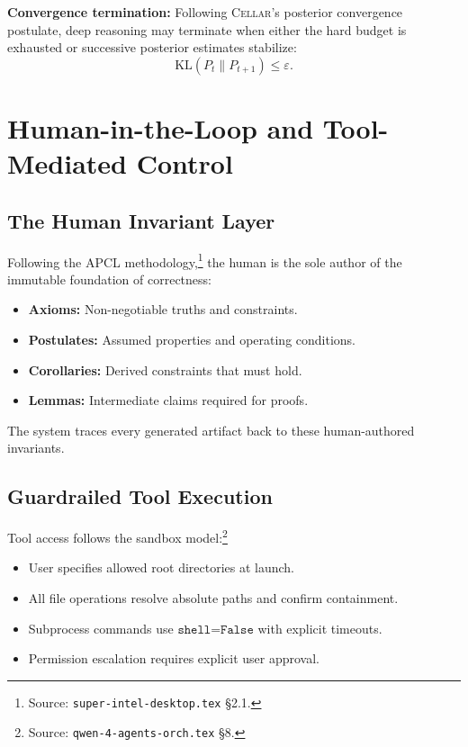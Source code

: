 \documentclass[11pt]{article}
\theoremstyle{remark}
\newcommand{\cellar}{\textsc{Cellar}}
\begin{document}
\textbf{Convergence termination:} Following \cellar{}'s posterior convergence postulate, deep reasoning may terminate when either the hard budget is exhausted or successive posterior estimates stabilize:
\[
\mathrm{KL}(P_t \| P_{t+1}) \le \varepsilon.
\]

\section{Human-in-the-Loop and Tool-Mediated Control}
\label{sec:hitl}

\subsection{The Human Invariant Layer}

Following the APCL methodology,\footnote{Source: \texttt{super-intel-desktop.tex} \S2.1.} the human is the sole author of the immutable foundation of correctness:
\begin{itemize}
  \item \textbf{Axioms:} Non-negotiable truths and constraints.
  \item \textbf{Postulates:} Assumed properties and operating conditions.
  \item \textbf{Corollaries:} Derived constraints that must hold.
  \item \textbf{Lemmas:} Intermediate claims required for proofs.
\end{itemize}

The system traces every generated artifact back to these human-authored invariants.

\subsection{Guardrailed Tool Execution}

Tool access follows the sandbox model:\footnote{Source: \texttt{qwen-4-agents-orch.tex} \S8.}
\begin{itemize}
  \item User specifies allowed root directories at launch.
  \item All file operations resolve absolute paths and confirm containment.
  \item Subprocess commands use $\texttt{shell=False}$ with explicit timeouts.
  \item Permission escalation requires explicit user approval.
\end{itemize}
\end{document}
